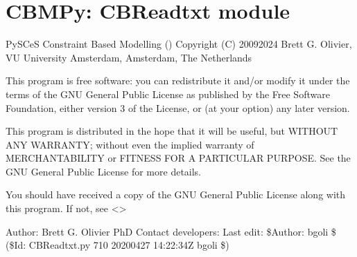 \documentclass[letterpaper,12pt,english]{sphinxmanual}
\begin{document}

\section{CBMPy: CBReadtxt module}
\label{\detokenize{api/io:cbmpy-cbreadtxt-module}}\label{\detokenize{api/io:module-cbmpy.CBReadtxt}}
\sphinxAtStartPar
PySCeS Constraint Based Modelling ()
Copyright (C) 2009\sphinxhyphen{}2024 Brett G. Olivier, VU University Amsterdam, Amsterdam, The Netherlands

\sphinxAtStartPar
This program is free software: you can redistribute it and/or modify
it under the terms of the GNU General Public License as published by
the Free Software Foundation, either version 3 of the License, or
(at your option) any later version.

\sphinxAtStartPar
This program is distributed in the hope that it will be useful,
but WITHOUT ANY WARRANTY; without even the implied warranty of
MERCHANTABILITY or FITNESS FOR A PARTICULAR PURPOSE.  See the
GNU General Public License for more details.

\sphinxAtStartPar
You should have received a copy of the GNU General Public License
along with this program.  If not, see \textless{}\textgreater{}

\sphinxAtStartPar
Author: Brett G. Olivier PhD
Contact developers: 
Last edit: \$Author: bgoli \$ (\$Id: CBReadtxt.py 710 2020\sphinxhyphen{}04\sphinxhyphen{}27 14:22:34Z bgoli \$)

\begin{fulllineitems}
\label{\detokenize{api/io:cbmpy.CBReadtxt.getBounds}}
\pysigstartsignatures
\pysiglinewithargsret
{}
{\sphinxparamcomma {}\sphinxparamcomma {}}
{}
\pysigstopsignatures
\end{fulllineitems}
\end{document}
